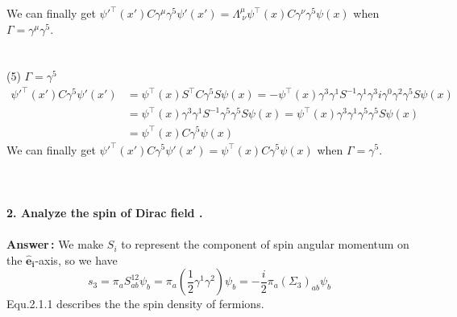 \documentclass[12pt]{article}
\begin{document}
\begin{spacing}{1.5}
We can finally get $\psi'^{\top}(x')C\gamma^{\mu}\gamma^{5}\psi'(x')=\Lambda^{\mu}_{\;\nu}\psi^{\top}(x)C\gamma^{\nu}\gamma^{5}\psi(x)$ when $\Gamma=\gamma^{\mu}\gamma^{5}$.\\
~\\
~\\
(5) $\Gamma=\gamma^{5}$
\begin{equation}
\begin{aligned}
\displaystyle \psi'^{\top}(x')C\gamma^{5}\psi'(x') &=\psi^{\top}(x)S^{\top}C\gamma^{5}S\psi(x)=-\psi^{\top}(x)\gamma^{3}\gamma^{1}S^{-1}\gamma^{1}\gamma^{3}i\gamma^{0}\gamma^{2}\gamma^{5}S\psi(x) \\
&=\psi^{\top}(x)\gamma^{3}\gamma^{1}S^{-1}\gamma^{5}\gamma^{5}S\psi(x)= \psi^{\top}(x)\gamma^{3}\gamma^{1}\gamma^{5}\gamma^{5}S\psi(x)\\
&=\psi^{\top}(x)C\gamma^{5}\psi(x)
\end{aligned}	\tag{1.5.1}
\end{equation}
We can finally get $\psi'^{\top}(x')C\gamma^{5}\psi'(x')=\psi^{\top}(x)C\gamma^{5}\psi(x)$ when $\Gamma=\gamma^{5}$.\\
~\\
~\\
~\\




\textbf{2. Analyze the spin of Dirac field .}\\
~\\
\textbf{Answer\,:} We make $S_{i}$ to represent the component of spin angular momentum on the $\bm{\hat e_{i}}$-axis, so we have 	%
\begin{equation}
\displaystyle 
s_{3}=\pi_{a}S^{12}_{ab}\psi_{b}=\pi_{a}(\frac{1}{2}\gamma^{1}\gamma^{2})\psi_{b}=-\frac{i}{2}\pi_{a}(\Sigma_{3})_{ab}\psi_{b}
	\tag{2.1.1}
\end{equation}
Equ.2.1.1 describes the the spin density of fermions.
~\\
~\\


\end{spacing}
\end{document}
